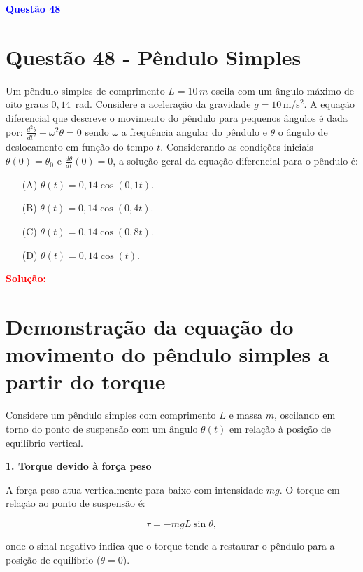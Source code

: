 \documentclass[a4paper,12pt]{article}
\begin{document}
\begin{flushleft}
\textbf{\textcolor{blue}{\Large Quest\~ao 48}}\\
\noindent
\section{Quest\~ao 48 - P\^endulo Simples}
Um pêndulo simples de comprimento \( L = 10\,m \) oscila com um ângulo máximo de oito graus \( 0{,}14\,\) rad.  
Considere a aceleração da gravidade \( g = 10\,\)m/s\(^2\). A equação diferencial que descreve o movimento do pêndulo para pequenos ângulos é dada por:
$\frac{d^2\theta}{dt^2} + \omega^2 \theta = 0$ sendo \( \omega \) a frequência angular do pêndulo e \( \theta \) o ângulo de deslocamento em função do tempo \( t \).  
Considerando as condições iniciais \( \theta(0) = \theta_0 \) e \( \frac{d\theta}{dt}(0) = 0 \), a solução geral da equação diferencial para o pêndulo é:

\begin{itemize}
\item[(A)] \( \theta(t) = 0{,}14\cos(0{,}1t) \).
\item[(B)] \( \theta(t) = 0{,}14\cos(0{,}4t) \).
\item[(C)] \( \theta(t) = 0{,}14\cos(0{,}8t) \).
\item[(D)] \( \theta(t) = 0{,}14\cos(t) \).
\end{itemize}

\vspace{0.5cm}

\textcolor{red}{\textbf{Solução:}}\\

\section*{Demonstração da equação do movimento do pêndulo simples a partir do torque}

Considere um pêndulo simples com comprimento \(L\) e massa \(m\), oscilando em torno do ponto de suspensão com um ângulo \(\theta(t)\) em relação à posição de equilíbrio vertical.

\bigskip

\textbf{1. Torque devido à força peso}

A força peso atua verticalmente para baixo com intensidade \(mg\). O torque em relação ao ponto de suspensão é:

\[
\boxed{\tau = - m g L \sin\theta,}
\]

onde o sinal negativo indica que o torque tende a restaurar o pêndulo para a posição de equilíbrio (\(\theta = 0\)).


\end{flushleft}
\end{document}
